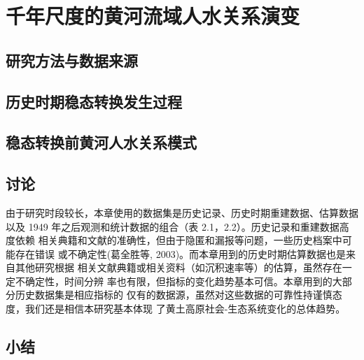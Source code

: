 \chapter{千年尺度的黄河流域人水关系演变}
\label{cha:3}


\section{研究方法与数据来源}
\label{ch3:methods}



\section{历史时期稳态转换发生过程}
\label{ch3:process}



\section{稳态转换前黄河人水关系模式}
\label{ch3:mechanism}

\section{讨论}



由于研究时段较长，本章使用的数据集是历史记录、历史时期重建数据、估算数据 以及 1949 年之后观测和统计数据的组合（表 2.1，2.2）。历史记录和重建数据高度依赖 相关典籍和文献的准确性，但由于隐匿和漏报等问题，一些历史档案中可能存在错误 或不确定性(葛全胜等, 2003)。而本章用到的历史时期估算数据也是来自其他研究根据 相关文献典籍或相关资料（如沉积速率等）的估算，虽然存在一定不确定性，时间分辨 率也有限，但指标的变化趋势基本可信。本章用到的大部分历史数据集是相应指标的 仅有的数据源，虽然对这些数据的可靠性持谨慎态度，我们还是相信本研究基本体现 了黄土高原社会-生态系统变化的总体趋势。

\section{小结}